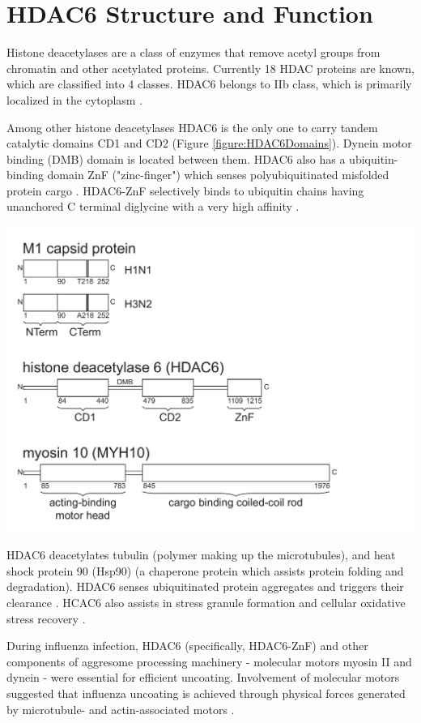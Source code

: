 \section{HDAC6 Structure and Function}

Histone deacetylases are a class of enzymes that remove acetyl groups from chromatin and other acetylated proteins. Currently 18 HDAC proteins are known, which are classified into 4 classes. HDAC6 belongs to IIb class, which is primarily localized in the cytoplasm \cite{hai2016histone}.

Among other histone deacetylases HDAC6 is the only one to carry tandem catalytic domains CD1 and CD2 (Figure \ref{figure:HDAC6Domains}). Dynein motor binding (DMB) domain is located between them. HDAC6 also has a ubiquitin-binding domain ZnF ("zinc-finger") which senses polyubiquitinated misfolded protein cargo \cite{hai2016histone}. HDAC6-ZnF selectively binds to ubiquitin chains having unanchored C terminal diglycine \cite{ouyang2012protein} with a very high affinity \cite{zhang2008mice}.

\begin{center}
\includegraphics[width=1\textwidth, trim={0cm 6cm 8cm 8.8cm}, clip]{D_chapters/0_introduction/protein_domains.pdf}
\label{figure:HDAC6Domains}
\end{center}

HDAC6 deacetylates tubulin \cite{zhang2003hdac, zhang2008mice} (polymer making up the microtubules), and heat shock protein 90 (Hsp90) \cite{kovacs2005hdac6} (a chaperone protein which assists protein folding and degradation). HDAC6 senses ubiquitinated protein aggregates and triggers their clearance \cite{boyault2007hdac6}. HCAC6 also assists in stress granule formation and cellular oxidative stress recovery \cite{kwon2007deacetylase}.

During influenza infection, HDAC6 (specifically, HDAC6-ZnF) and other components of aggresome processing machinery - molecular motors myosin II and dynein - were essential for efficient uncoating. Involvement of molecular motors suggested that influenza uncoating is achieved through physical forces generated by microtubule- and actin-associated motors \cite{banerjee2014influenza}.

